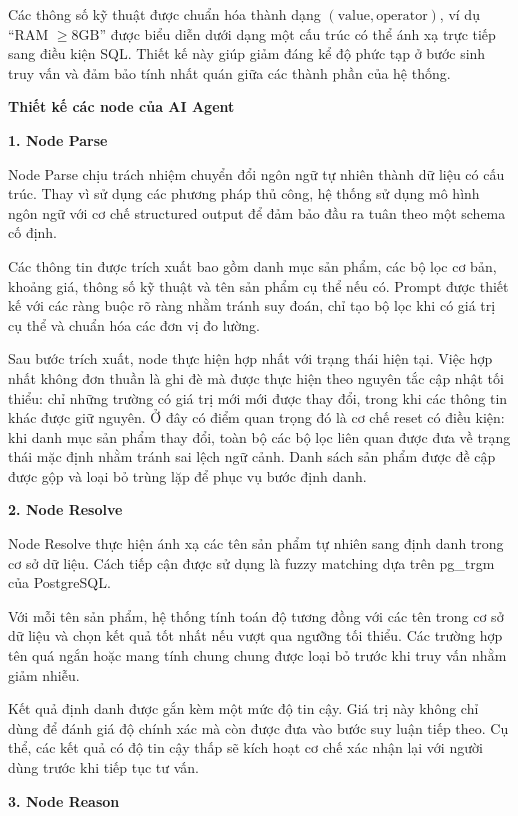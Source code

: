 Các thông số kỹ thuật được chuẩn hóa thành dạng $(\text{value}, \text{operator})$, ví dụ ``RAM $\geq 8\text{GB}$'' được biểu diễn dưới dạng một cấu trúc có thể ánh xạ trực tiếp sang điều kiện SQL. Thiết kế này giúp giảm đáng kể độ phức tạp ở bước sinh truy vấn và đảm bảo tính nhất quán giữa các thành phần của hệ thống.

\textbf{Thiết kế các node của AI Agent}

\textbf{1. Node Parse}

Node Parse chịu trách nhiệm chuyển đổi ngôn ngữ tự nhiên thành dữ liệu có cấu trúc. Thay vì sử dụng các phương pháp thủ công, hệ thống sử dụng mô hình ngôn ngữ với cơ chế structured output để đảm bảo đầu ra tuân theo một schema cố định.

Các thông tin được trích xuất bao gồm danh mục sản phẩm, các bộ lọc cơ bản, khoảng giá, thông số kỹ thuật và tên sản phẩm cụ thể nếu có. Prompt được thiết kế với các ràng buộc rõ ràng nhằm tránh suy đoán, chỉ tạo bộ lọc khi có giá trị cụ thể và chuẩn hóa các đơn vị đo lường.

Sau bước trích xuất, node thực hiện hợp nhất với trạng thái hiện tại. Việc hợp nhất không đơn thuần là ghi đè mà được thực hiện theo nguyên tắc cập nhật tối thiểu: chỉ những trường có giá trị mới mới được thay đổi, trong khi các thông tin khác được giữ nguyên. Ở đây có điểm quan trọng đó là cơ chế reset có điều kiện: khi danh mục sản phẩm thay đổi, toàn bộ các bộ lọc liên quan được đưa về trạng thái mặc định nhằm tránh sai lệch ngữ cảnh. Danh sách sản phẩm được đề cập được gộp và loại bỏ trùng lặp để phục vụ bước định danh.

\textbf{2. Node Resolve}

Node Resolve thực hiện ánh xạ các tên sản phẩm tự nhiên sang định danh trong cơ sở dữ liệu. Cách tiếp cận được sử dụng là fuzzy matching dựa trên pg\_trgm của PostgreSQL.

Với mỗi tên sản phẩm, hệ thống tính toán độ tương đồng với các tên trong cơ sở dữ liệu và chọn kết quả tốt nhất nếu vượt qua ngưỡng tối thiểu. Các trường hợp tên quá ngắn hoặc mang tính chung chung được loại bỏ trước khi truy vấn nhằm giảm nhiễu.

Kết quả định danh được gắn kèm một mức độ tin cậy. Giá trị này không chỉ dùng để đánh giá độ chính xác mà còn được đưa vào bước suy luận tiếp theo. Cụ thể, các kết quả có độ tin cậy thấp sẽ kích hoạt cơ chế xác nhận lại với người dùng trước khi tiếp tục tư vấn.

\textbf{3. Node Reason}

